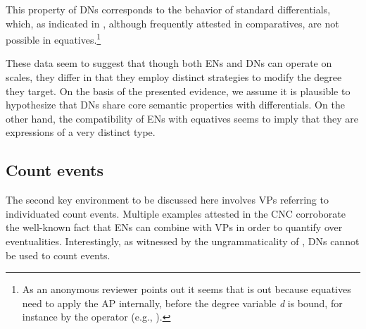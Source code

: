 \documentclass[output=paper,
modfonts,
hidelinks,
newtxmath
]{langscibook}
\begin{document}
\ea {}
\z \z

\noindent This property of DNs corresponds to the behavior of standard differentials, which, as indicated in , although frequently attested in comparatives, are not possible in equatives.\footnote{As an anonymous reviewer points out it seems that  is out because equatives need to apply the AP internally, before the degree variable \textit{d} is bound, for instance by the  operator (e.g., \citealt{kennedy_mcnally2005scale}).}

\ea \label{diff} 
\z \z

\noindent These data seem to suggest that though both ENs and DNs can operate on scales, they differ in that they employ distinct strategies to modify the degree they target. On the basis of the presented evidence, we assume it is plausible to hypothesize that DNs share core semantic properties with differentials. On the other hand, the compatibility of ENs with equatives seems to imply that they are expressions of a very distinct type.

\subsection{Count events}\label{count-events}

The second key environment to be discussed here involves VPs referring to individuated count events. Multiple examples attested in the CNC corroborate the well-known fact that ENs can combine with VPs in order to quantify over eventualities. Interestingly, as witnessed by the ungrammaticality of , DNs cannot be used to count events.
\end{document}
